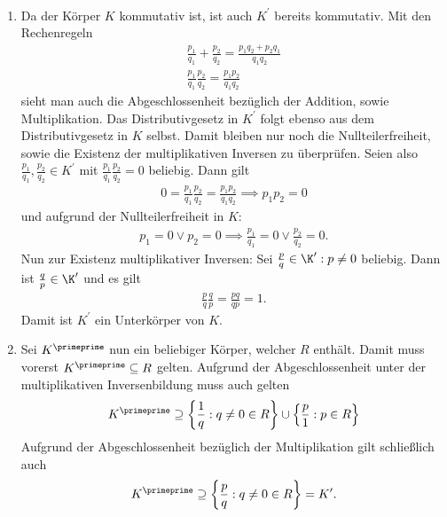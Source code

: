 \begin{solution}
\leavevmode \\
\begin{enumerate}
  \item Da der Körper $K$ kommutativ ist, ist auch $K^{\prime}$ bereits kommutativ.
  Mit den Rechenregeln
  \begin{align*}
    \frac{p_1}{q_1} + \frac{p_2}{q_2} = \frac{p_1q_2 + p_2q_1}{q_1q_2} \\
    \frac{p_1}{q_1}   \frac{p_2}{q_2} = \frac{p_1p_2}{q_1q_2}
  \end{align*}
  sieht man auch die Abgeschlossenheit bezüglich der Addition, sowie Multiplikation.
  Das Distributivgesetz in $K^{\prime}$ folgt ebenso aus dem Distributivgesetz in $K$ selbst.
  Damit bleiben nur noch die Nullteilerfreiheit, sowie die Existenz der multiplikativen Inversen zu überprüfen.
  Seien also $\frac{p_1}{q_1}, \frac{p_2}{q_2} \in K^{\prime}$ mit $\frac{p_1}{q_1}   \frac{p_2}{q_2} = 0$ beliebig.
  Dann gilt
  \begin{align*}
    0 = \frac{p_1}{q_1}   \frac{p_2}{q_2} = \frac{p_1p_2}{q_1q_2} \implies p_1p_2 = 0
  \end{align*}
  und aufgrund der Nullteilerfreiheit in $K:$
  \begin{align*}
    p_1 = 0 \lor p_2 = 0 \implies \frac{p_1}{q_1} = 0 \lor \frac{p_2}{q_2} = 0.
  \end{align*}
  Nun zur Existenz multiplikativer Inversen: Sei $\frac{p}{q} \in \K^{\prime}: p \neq 0$ beliebig.
  Dann ist $\frac{q}{p} \in \K^{\prime}$ und es gilt
  \begin{align*}
    \frac{p}{q}\frac{q}{p} = \frac{pq}{qp} = 1.
  \end{align*}
  Damit ist $K^{\prime}$ ein Unterkörper von $K$.
  \item Sei $K^{\primeprime}$ nun ein beliebiger Körper, welcher $R$ enthält.
  Damit muss vorerst $K^{\primeprime} \subseteq R$ gelten. Aufgrund der Abgeschlossenheit
  unter der multiplikativen Inversenbildung muss auch gelten
  \begin{align*}
    K^{\primeprime} \supseteq \left\{\frac{1}{q}: q \neq 0 \in R\right\} \cup \left\{\frac{p}{1}: p \in R\right\}
  \end{align*}
  Aufgrund der Abgeschlossenheit bezüglich der Multiplikation gilt schließlich auch
  \begin{align*}
    K^{\primeprime} \supseteq  \left\{\frac{p}{q}: q \neq 0 \in R\right\} = K^{\prime}.
  \end{align*}

\end{enumerate}
\end{solution}
